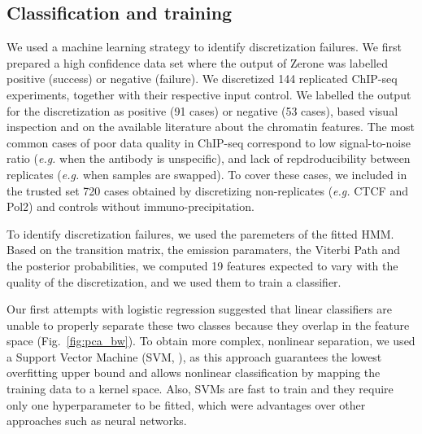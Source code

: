 \documentclass{bioinfo}
\begin{document}
\begin{methods}
\subsection{Classification and training}
\label{sub:training}
We used a machine learning strategy to identify discretization
failures. We first prepared a high confidence data set where the
output of Zerone was labelled positive (success) or negative (failure).
We discretized 144 replicated ChIP-seq experiments, together with their
respective input control.
We labelled the output for the discretization as positive (91 cases)
or negative (53 cases), based visual inspection and on the available
literature about the chromatin features. The most common cases of
poor data quality in ChIP-seq correspond to low signal-to-noise ratio
(\textit{e.g.} when the antibody is unspecific), and lack of
repdroducibility between replicates (\textit{e.g.} when samples are
swapped). To cover these cases, we included in the trusted set
720 cases obtained by discretizing non-replicates
(\textit{e.g.} CTCF and Pol2) and controls without immuno-precipitation.

To identify discretization failures, we used the paremeters of the
fitted HMM. Based on the transition matrix, the emission paramaters,
the Viterbi Path and the posterior probabilities,
we computed 19 features expected to vary with the quality
of the discretization, and we used them to train a classifier.

Our first attempts with logistic regression suggested that linear
classifiers are unable to properly separate these two classes because
they overlap in the feature space (Fig.~\ref{fig:pca_bw}). To obtain more
complex, nonlinear separation, we used a Support Vector Machine
(SVM, \citealp{Chang2011,e1071}), as this approach guarantees the lowest
overfitting upper bound and allows nonlinear classification by mapping
the training data to a kernel space. Also, SVMs are fast to train and
they require only one hyperparameter to be fitted, which were
advantages over other approaches such as neural networks.


\end{methods}
\end{document}
